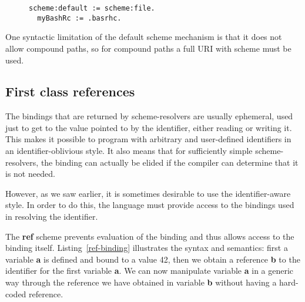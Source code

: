\documentclass[preprint,authoryear]{acm_proc_article-sp}
\begin{document}
\begin{figure}[htbp]
\begin{lstlisting}[style=L,label=file-as-default-scheme,caption=File copy with file: as default scheme.]
  scheme:default := scheme:file.
  myBashRc := .basrhc.
\end{lstlisting}
\end{figure}

One syntactic limitation of the default scheme mechanism is that it does not allow
compound paths, so for compound paths a full URI with scheme must be used.


\subsection{First class references}

The bindings that are returned by scheme-resolvers are usually ephemeral, used just 
to get to the value pointed to by the identifier, either reading or writing it.  This
makes it possible to program with arbitrary and user-defined identifiers in
an identifier-oblivious style.  It also means that for sufficiently simple scheme-resolvers,
the binding can actually be elided if the compiler can determine that it is not needed.

However, as we saw earlier, it is sometimes
desirable to use the identifier-aware style.  In order to do this, the language
must provide access to the bindings used in resolving the identifier.

The {\bf ref} scheme prevents evaluation of the binding and thus allows access
to the binding itself.  Listing~\ref{ref-binding} illustrates the syntax and semantics:
first a variable {\bf a} is defined and bound to a value 42, then we obtain a reference {\bf b} to
the identifier for the first variable {\bf a}.  We can now manipulate variable {\bf a} 
in a generic way through the reference we have obtained in variable {\bf b} without
having a hard-coded reference. 

\end{document}
